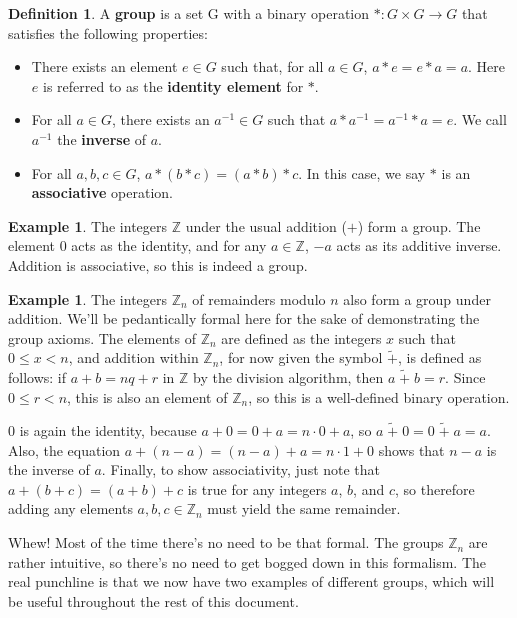 \documentclass[12pt]{article}
\newcommand{\inv}[1]{#1^{-1}}
\newcommand{\z}{\mathbb{Z}}
\newcommand{\np}{\;\tilde{+}\;}
\newcommand{\zn}[1][]{\mathbb{Z}_{#1}}
\theoremstyle{definition}
\theoremstyle{definition}
\newtheorem{definition}[theorem]{Definition}
\theoremstyle{definition}
\newtheorem{example}[theorem]{Example}
\theoremstyle{definition}
\begin{document}
\begin{definition}
A \textbf{group} is a set G with a binary operation $*: G \times G \to G$ that satisfies the following properties:
\begin{itemize}
    \item There exists an element $e \in G$ such that, for all $a \in G$, $a*e = e*a = a$. Here $e$ is referred to as the \textbf{identity element} for $*$.
    \item For all $a \in G$, there exists an $\inv{a} \in G$ such that $a*\inv{a} = \inv{a}*a = e$. We call $\inv{a}$ the \textbf{inverse} of $a$.
    \item For all $a, b, c \in G$, $a * (b * c) = (a * b) * c$. In this case, we say $*$ is an \textbf{associative} operation.
\end{itemize}
\end{definition}

\begin{example}
The integers $\z$ under the usual addition ($+$) form a group. The element $0$ acts as the identity, and for any $a \in \z$, $-a$ acts as its additive inverse. Addition is associative, so this is indeed a group.
\end{example}

\begin{example}
The integers $\zn[n]$ of remainders modulo $n$ also form a group under addition. We'll be pedantically formal here for the sake of demonstrating the group axioms. The elements of $\zn[n]$ are defined as the integers $x$ such that $0 \leq x < n$, and addition within $\zn[n]$, for now given the symbol $\tilde +$, is defined as follows: if $a + b = nq + r$ in $\z$ by the division algorithm, then $a \np b = r$. Since $0 \leq r < n$, this is also an element of $\zn[n]$, so this is a well-defined binary operation.

$0$ is again the identity, because $a + 0 = 0 + a = n\cdot 0 + a$, so $a \np 0 = 0 \np a = a$. Also, the equation $a + (n-a) = (n-a) + a = n\cdot 1 + 0$ shows that $n-a$ is the inverse of $a$. Finally, to show associativity, just note that $a + (b + c) = (a + b) + c$ is true for any integers $a$, $b$, and $c$, so therefore adding any elements $a, b, c \in \zn[n]$ must yield the same remainder.
\end{example}

Whew! Most of the time there's no need to be that formal. The groups $\zn[n]$ are rather intuitive, so there's no need to get bogged down in this formalism. The real punchline is that we now have two examples of different groups, which will be useful throughout the rest of this document.
\end{document}
